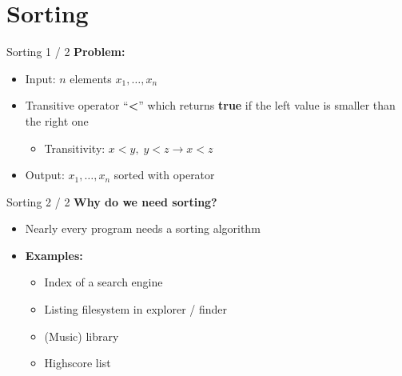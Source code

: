\section{Sorting}

\begin{frame}{Sorting 1 / 2}
  \textbf{Problem:}
  \begin{itemize}
    \item
      Input: $n$ elements $x_1, \ldots, x_n$
    \item
      Transitive operator \enquote{\textbf{\color{Mittel-Blau}<}} which returns
      \textbf{\color{Mittel-Blau}true} if the left value is smaller than the 
      right one
      \begin{itemize}
        \item
          Transitivity: $x < y, \; y < z \rightarrow x < z$
      \end{itemize}
    \item
      Output: $x_1, \ldots, x_n$ sorted with operator
  \end{itemize}
\end{frame}


\begin{frame}{Sorting 2 / 2}
  \textbf{Why do we need sorting?}
  \begin{itemize}
    \item
      Nearly {\color{Mittel-Blau}every} program needs a sorting algorithm
    \item
      \textbf{Examples:}
      \begin{itemize}
        \item
          Index of a search engine
        \item
          Listing filesystem in explorer / finder
        \item
          (Music) library
        \item
          Highscore list
      \end{itemize}
  \end{itemize}
\end{frame}
